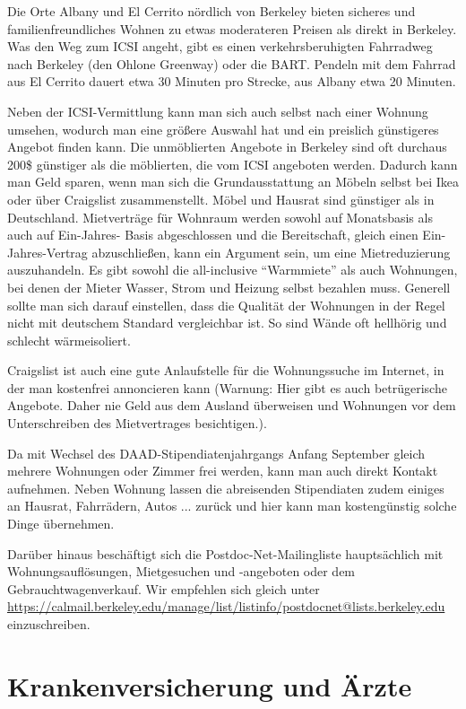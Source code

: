 \documentclass[a4paper]{scrreprt}
\begin{document}
Die Orte Albany und El Cerrito nördlich von Berkeley bieten sicheres und familienfreundliches Wohnen zu etwas moderateren Preisen als direkt in Berkeley. Was den Weg zum ICSI angeht, gibt es einen verkehrsberuhigten Fahrradweg nach Berkeley (den Ohlone Greenway) oder die BART. Pendeln mit dem Fahrrad aus El Cerrito dauert etwa 30 Minuten pro Strecke, aus Albany etwa 20 Minuten.

Neben der ICSI-Vermittlung kann man sich auch selbst nach einer Wohnung umsehen, wodurch man eine größere Auswahl hat und ein preislich günstigeres Angebot finden kann. Die unmöblierten Angebote in Berkeley sind oft durchaus 200\$ günstiger als die möblierten, die vom ICSI angeboten werden. Dadurch kann man Geld sparen, wenn man sich die Grundausstattung an Möbeln selbst bei Ikea oder über Craigslist zusammenstellt. Möbel und Hausrat sind günstiger als in Deutschland. Mietverträge für Wohnraum werden sowohl auf Monatsbasis als auch auf Ein-Jahres- Basis abgeschlossen und die Bereitschaft, gleich einen Ein-Jahres-Vertrag abzuschließen, kann ein Argument sein, um eine Mietreduzierung auszuhandeln. Es gibt sowohl die all-inclusive "`Warmmiete"' als auch Wohnungen, bei denen der Mieter Wasser, Strom und Heizung selbst bezahlen muss. Generell sollte man sich darauf einstellen, dass die Qualität der Wohnungen in der Regel nicht mit deutschem Standard vergleichbar ist. So sind Wände oft hellhörig und schlecht wärmeisoliert.

Craigslist ist auch eine gute Anlaufstelle für die Wohnungssuche im Internet, in der man kostenfrei annoncieren kann (Warnung: Hier gibt es auch betrügerische Angebote. Daher nie Geld aus dem Ausland überweisen und Wohnungen vor dem Unterschreiben des Mietvertrages besichtigen.).

Da mit Wechsel des DAAD-Stipendiatenjahrgangs Anfang September gleich mehrere Wohnungen oder Zimmer frei werden, kann man auch direkt Kontakt aufnehmen. Neben Wohnung lassen die abreisenden Stipendiaten zudem einiges an Hausrat, Fahrrädern, Autos ... zurück und hier kann man kostengünstig solche Dinge übernehmen.

Darüber hinaus beschäftigt sich die Postdoc-Net-Mailingliste hauptsächlich mit Wohnungsauflösungen, Mietgesuchen und -angeboten oder dem Gebrauchtwagenverkauf. Wir empfehlen sich gleich unter \url{https://calmail.berkeley.edu/manage/list/listinfo/postdocnet@lists.berkeley.edu}  einzuschreiben.


\section{Krankenversicherung und Ärzte}
\end{document}
